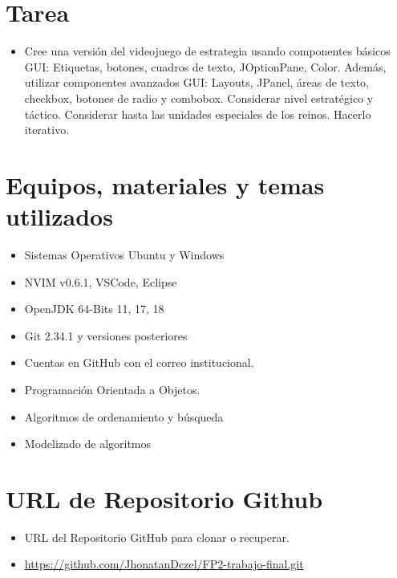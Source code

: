 \documentclass{article}
\begin{document}
	\section{Tarea}
	\begin{itemize}		%
		\item \textbf{}
Cree una versión del videojuego de estrategia usando componentes básicos GUI: Etiquetas, botones,
cuadros de texto, JOptionPane, Color.
Además, utilizar componentes avanzados GUI: Layouts, JPanel, áreas de texto, checkbox, botones de
radio y combobox.
Considerar nivel estratégico y táctico.
Considerar hasta las unidades especiales de los reinos.
Hacerlo iterativo.
 

	\end{itemize}
		
	\section{Equipos, materiales y temas utilizados}
	\begin{itemize}
		\item Sistemas Operativos Ubuntu y Windows 
		\item NVIM v0.6.1, VSCode, Eclipse
		\item OpenJDK 64-Bits 11, 17, 18
		\item Git 2.34.1 y versiones posteriores
		\item Cuentas en GitHub con el correo institucional.
		\item Programación Orientada a Objetos.
		\item Algoritmos de ordenamiento y búsqueda
		\item Modelizado de algoritmos
	\end{itemize}
	
	\section{URL de Repositorio Github}
	\begin{itemize}
		\item URL del Repositorio GitHub para clonar o recuperar.
		\item \url{https://github.com/JhonatanDczel/FP2-trabajo-final.git}
	\end{itemize}
	
	

\end{document}
